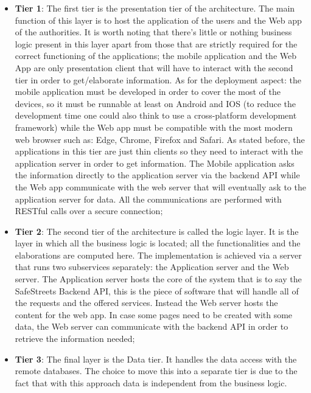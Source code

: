 \begin{itemize}
  \item \textbf{Tier 1}: The first tier is the presentation tier of the architecture. The main function of this layer is to host  the application of the users and the Web app of the authorities. It is worth noting that there's little or nothing business logic present in this layer apart from those that are strictly required for the correct functioning of the applications; the mobile application and the Web App are only presentation client that will have to interact with the second tier in order to get/elaborate information. As for the deployment aspect: the mobile application must be developed in order to cover the most of the devices, so it must be runnable at least on Android and IOS (to reduce the development time one could also think to use a cross-platform development framework) while the Web app must be compatible with the most modern web browser such as: Edge, Chrome, Firefox and Safari. As stated before, the applications in this tier are just thin clients so they need to interact with the application server in order to get information. The Mobile application asks the information directly to the application server via the backend API while the Web app communicate with the web server that will eventually ask to the application server for data. All the communications are performed with RESTful calls over a secure connection;
  \item \textbf{Tier 2}: The second tier of the architecture is called the logic layer. It is the layer in which all the business logic is located; all the functionalities and the elaborations are computed here. The implementation is achieved via a server that runs two subservices separately: the Application server and the Web server. The Application server hosts the core of the system that is to say the SafeStreets Backend API, this is the piece of software that will handle all of the requests and the offered services. Instead the Web server hosts the content for the web app. In case some pages need to be created with some data, the Web server can communicate with the backend API in order to retrieve the information needed;
  \item \textbf{Tier 3}: The final layer is the Data tier. It handles the data access with the remote databases. The choice to move this into a separate tier is due to the fact that with this approach data is independent from the business logic.
\end{itemize}
